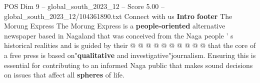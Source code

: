 \begin{textsample}{POS Dim 9 – global\_south\_2023\_12 – Score 5.00 – global\_south\_2023\_12/104361890.txt}
Connect with us \textbf{Intro} \textbf{footer} The Morung Express The Morung Express is a \textbf{people-oriented} alternative newspaper based in Nagaland that was conceived from the Naga people ' s historical realities and is guided by their @ @ @ @ @ @ @ @ @ @ that the core of a free press is based on"\textbf{qualitative} and investigative"journalism.
Ensuring this is essential for contributing to an informed Naga public that makes sound decisions on issues that affect all \textbf{spheres} of life.

\end{textsample}
